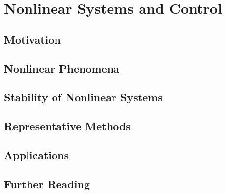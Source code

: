 \chapter{Nonlinear Systems and Control} \label{ch:nonlinear_control}

    \section{Motivation}

    \section{Nonlinear Phenomena}

    \section{Stability of Nonlinear Systems}

    \section{Representative Methods}

    \section{Applications}

    \section{Further Reading}